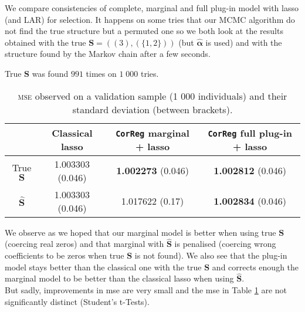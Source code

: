 \documentclass[12pt,a4paper]{report}
\begin{document}
		
		We compare consistencies of complete, marginal and full plug-in model with {\sc lasso} (and LAR) for selection.
		It happens on some tries that our MCMC algorithm do not find the true structure but a permuted one so we both look at the results obtained with the true $\boldsymbol{S}=((3),(\{1,2\}))$ (but $\hat{\boldsymbol{\alpha}}$ is used) and with the structure found by the Markov chain after a few seconds.
		
		True $\boldsymbol{S}$ was found $991$ times on $1\;000$ tries.%
		
		\begin{table}[h!]
		\centering
		\begin{tabular}{|c|c|c|c|}
		\hline 
		 & Classical {\sc lasso} & {\tt CorReg} marginal + {\sc lasso}& {\tt CorReg} full plug-in + {\sc lasso}\\ 
		\hline 
		True $\boldsymbol{S}$ &  1.003303 (0.046) & \textbf{1.002273} (0.046)& \textbf{1.002812} (0.046)\\ 
		\hline 
		$\hat{\boldsymbol{S}}$ & 1.003303 (0.046)& 1.017622 (0.17)& \textbf{1.002834} (0.046)\\ 
		\hline 
		\end{tabular} 
		\caption{\textsc{mse} observed on a validation sample (1 000 individuals) and their standard deviation (between brackets).}\label{MSEconsistlasso}
		\end{table}

		We observe as we hoped that our marginal model is better when using true $\boldsymbol{S}$ (coercing real zeros) and that marginal with $\hat{\boldsymbol{S}}$ is penalised (coercing wrong coefficients to be zeros when true $\boldsymbol{S}$ is not found).
		We also see that the plug-in model stays better than the classical one with the true $\boldsymbol{S}$ and corrects enough the marginal model to be better than the classical {\sc lasso} when using $\hat{\boldsymbol{S}}$. \\
		
		But sadly, improvements in {\sc mse} are very small and the {\sc mse} in Table \ref{MSEconsistlasso} are not significantly distinct (Student's t-Tests).\\
\end{document}
